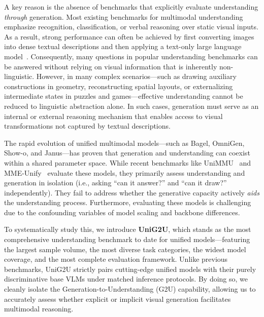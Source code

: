 \documentclass{article}
\theoremstyle{plain}
\theoremstyle{definition}
\theoremstyle{remark}
\begin{document}
A key reason is the absence of benchmarks that explicitly evaluate understanding \emph{through} generation. Most existing benchmarks for multimodal understanding emphasize recognition, classification, or verbal reasoning over static visual inputs. As a result, strong performance can often be achieved by first converting images into dense textual descriptions and then applying a text-only large language model~\cite{xing2025caprl,qiao2024prism}. Consequently, many questions in popular understanding benchmarks can be answered without relying on visual information that is inherently non-linguistic. However, in many complex scenarios—such as drawing auxiliary constructions in geometry, reconstructing spatial layouts, or externalizing intermediate states in puzzles and games—effective understanding cannot be reduced to linguistic abstraction alone. In such cases, generation must serve as an internal or external reasoning mechanism that enables access to visual transformations not captured by textual descriptions.

The rapid evolution of unified multimodal models—such as Bagel, OmniGen, Show-o, and Janus—has proven that generation and understanding can coexist within a shared parameter space. While recent benchmarks like UniMMU~\cite{zou2025unimmmu} and MME-Unify~\cite{xie2025mmeunify} evaluate these models, they primarily assess understanding and generation in isolation (i.e., asking ``can it answer?'' and ``can it draw?'' independently). They fail to address whether the generative capacity actively \emph{aids} the understanding process. Furthermore, evaluating these models is challenging due to the confounding variables of model scaling and backbone differences. 

To systematically study this, we introduce \textbf{UniG2U}, which stands as the most comprehensive understanding benchmark to date for unified models—featuring the largest sample volume, the most diverse task categories, the widest model coverage, and the most complete evaluation framework. Unlike previous benchmarks, UniG2U strictly pairs cutting-edge unified models with their purely discriminative base VLMs under matched inference protocols. By doing so, we cleanly isolate the Generation-to-Understanding (G2U) capability, allowing us to accurately assess whether explicit or implicit visual generation facilitates multimodal reasoning.
\end{document}
